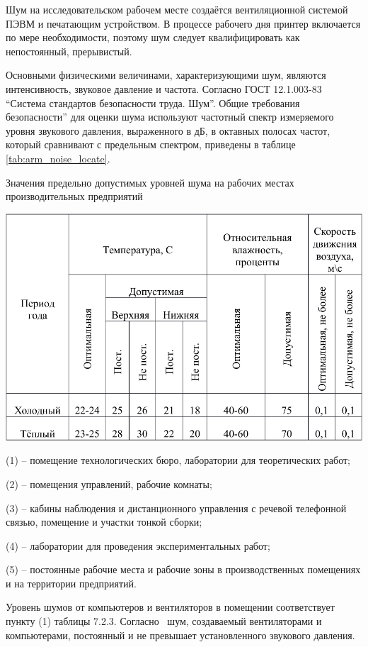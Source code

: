Шум на исследовательском рабочем месте создаётся вентиляционной системой ПЭВМ и печатающим устройством. В процессе рабочего дня принтер включается по мере необходимости, поэтому шум следует квалифицировать как непостоянный, прерывистый.

Основными физическими величинами, характеризующими шум, являются интенсивность, звуковое давление и частота. Согласно ГОСТ 12.1.003-83 ``Система стандартов безопасности труда. Шум''\cite{gost_sec_noize}. Общие требования безопасности'' для оценки шума используют частотный спектр измеряемого уровня звукового давления, выраженного в дБ, в октавных полосах частот, который сравнивают с предельным спектром, приведены в таблице \ref{tab:arm_noise_locate}.

\begin{table}[!ht]
\caption{Значения предельно допустимых уровней шума на рабочих местах производительных предприятий}
\centering
\includegraphics[page=4, width=1\linewidth]{secure_table.pdf}
\label{tab:arm_noise_locate}
\end{table}

(1) – помещение технологических бюро, лаборатории для теоретических работ;

(2) – помещения управлений, рабочие комнаты;

(3) – кабины наблюдения и дистанционного управления с речевой телефонной связью, помещение и участки тонкой сборки;

(4) – лаборатории для проведения экспериментальных работ;

(5) – постоянные рабочие места и рабочие зоны в производственных помещениях и на территории предприятий.

Уровень шумов от компьютеров и вентиляторов в помещении соответствует пункту (1) таблицы 7.2.3. Согласно~\cite{gost_sec_ergo_33} шум, создаваемый вентиляторами и компьютерами, постоянный и не превышает установленного звукового давления.
